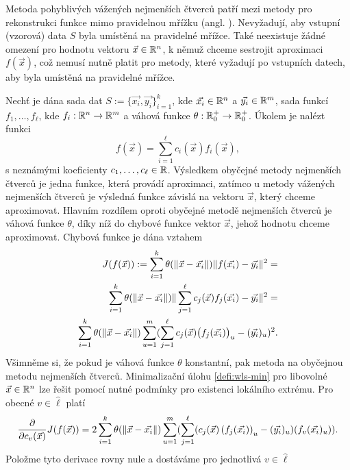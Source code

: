 Metoda pohyblivých vážených nejmenších čtverců patří mezi metody pro rekonstrukci funkce mimo pravidelnou mřížku (angl. ). Nevyžadují, aby vstupní (vzorová) data $S$ byla umístěná na pravidelné mřížce. Také neexistuje žádné omezení pro hodnotu vektoru $\vec{x} \in \mathbb{R}^n$, k němuž chceme sestrojit aproximaci $f(\vec{x})$, což nemusí nutně platit pro metody, které vyžadují po vstupních datech, aby byla umístěná na pravidelné mřížce.

Nechť je dána sada dat $S := \{\vec{x_i}, \vec{y_i}\}_{i = 1}^k$, kde $\vec{x_i} \in \mathbb{R}^n$ a $\vec{y_i} \in \mathbb{R}^m$, sada funkcí $f_1,\ldots,f_\ell$, kde $f_i: \mathbb{R}^n \rightarrow \mathbb{R}^m$ a váhová funkce $\theta: \mathbb{R}^+_0 \rightarrow \mathbb{R}^+_0$. Úkolem je nalézt funkci
\[
  f(\vec{x}) = \sum_{i=1}^\ell c_i(\vec{x})f_i(\vec{x}),
\]
s neznámými koeficienty $c_1,\ldots,c_\ell \in \mathbb{R}$. Výsledkem obyčejné metody nejmenších čtverců je jedna funkce, která provádí  aproximaci, zatímco u metody vážených nejmenších čtverců je výsledná funkce závislá na vektoru $\vec{x}$, který chceme aproximovat. Hlavním rozdílem oproti obyčejné metodě nejmenších čtverců je váhová funkce $\theta$, díky níž do chybové funkce  vektor $\vec{x}$, jehož hodnotu chceme aproximovat. Chybová funkce je dána vztahem
\begin{align}
  \label{defi:wls-min}
  J(f(\vec{x})) := \sum_{i=1}^k \theta(\|\vec{x} - \vec{x_i}\|)\|f(\vec{x_i}) - \vec{y_i}\|^2 =&\notag\\
  \sum_{i=1}^k\theta(\|\vec{x} - \vec{x_i}\|)\|\sum_{j=1}^\ell c_j(\vec{x})f_j(\vec{x_i}) - \vec{y_i}\|^2 =&\notag\\
  \sum_{i=1}^k\theta(\|\vec{x} - \vec{x_i}\|)\sum_{u=1}^m(\sum_{j=1}^\ell c_j(\vec{x})\big(f_j(\vec{x_i})\big)_u - (\vec{y_i})_u)^2.
\end{align}
Všimněme si, že pokud je váhová funkce $\theta$ konstantní, pak metoda  na obyčejnou metodu nejmenších čtverců. Minimalizační úlohu \eqref{defi:wls-min} pro libovolné $\vec{x} \in \mathbb{R}^n$ lze řešit pomocí nutné podmínky pro existenci lokálního extrému. Pro obecné $v \in \hat \ell$ platí
\[
  \frac{\partial}{\partial c_v(\vec{x})}J(f(\vec{x})) =
  2\sum_{i=1}^k \theta(\|\vec{x}-\vec{x_i}\|) \sum_{u=1}^m (\sum_{j=1}^\ell (c_j(\vec{x})\left(f_j(\vec{x_i})\right)_u-(\vec{y_i})_u)(f_v(\vec{x_i})_u)).
\]
Položme tyto derivace rovny nule a dostáváme pro jednotlivá $v \in \hat \ell$
